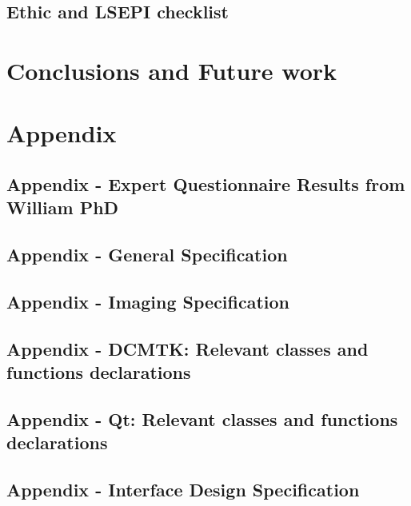 \documentclass[12pt,twoside]{article}
\begin{document}
\clearpage
\subsection{Ethic and LSEPI checklist}


\clearpage
\section{Conclusions and Future work}



\clearpage
\section{Appendix}
\clearpage

\subsection {Appendix  - Expert Questionnaire Results from William PhD}





\clearpage

\subsection {Appendix  - General Specification}


\clearpage

\subsection {Appendix  - Imaging Specification}


\clearpage
\subsection {Appendix  - DCMTK: Relevant classes and functions declarations}


\clearpage
\subsection {Appendix  - Qt: Relevant classes and functions declarations}


\clearpage
\subsection {Appendix  - Interface Design Specification}



\printbibliography
\end{document}
